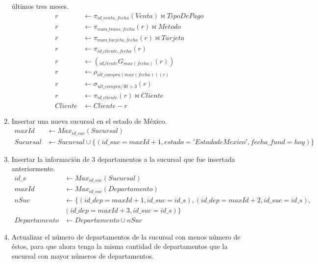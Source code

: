\documentclass{article}
\begin{document}
\begin{enumerate}
{            últimos tres meses.
            \begin{align*}
                r &\leftarrow \pi_{id\_venta, fecha}(Venta) \bowtie TipoDePago \\
                r &\leftarrow \pi_{num\_trans, fecha}(r) \bowtie Metodo \\
                r &\leftarrow \pi_{num\_tarjeta, fecha}(r) \bowtie Tarjeta \\
                r &\leftarrow \pi_{id\_cliente, fecha}(r) \\
                r &\leftarrow (_{id_cliente}G_{max(fecha)}(r)) \\
                r &\leftarrow \rho_{ult\_compra(max(fecha))(r)} \\
                r &\leftarrow \sigma_{ult\_compra/30 > 3}(r) \\
                r &\leftarrow \pi_{id\_cliente}(r) \bowtie Cliente \\
                Cliente &\leftarrow Cliente - r
            \end{align*}
        }
        \item {
            Insertar una nueva sucursal en el estado de México.
            \begin{align*}
                maxId &\leftarrow Max_{id\_suc}(Sucursal)\\
                Sucursal &\leftarrow Sucursal 
                \cup \{(id\_suc = maxId+1, estado='Estado de Mexico', 
                fecha\_fund = hoy)\}
            \end{align*}
        }
        \item {
            Insertar la información de 3 departamentos a la sucursal que fue
            insertada anteriormente.
            \begin{align*}
                id\_s &\leftarrow Max_{id\_suc}(Sucursal)\\
                maxId &\leftarrow Max_{id\_suc}(Departamento)\\
                nSuc &\leftarrow \{(id\_dep = maxId+1, id\_suc=id\_s),
                (id\_dep = maxId+2, id\_suc=id\_s),\\
                &(id\_dep = maxId+3, id\_suc=id\_s)\}\\
                Departamento &\leftarrow Departamento \cup nSuc
            \end{align*}
        }
        \item {
            Actualizar el número de departamentos de la sucursal con menos
            número de éstos, para que ahora tenga la misma cantidad de departamentos
            que la sucursal con mayor números de departamentos.
        }
    \end{enumerate}
\end{document}
